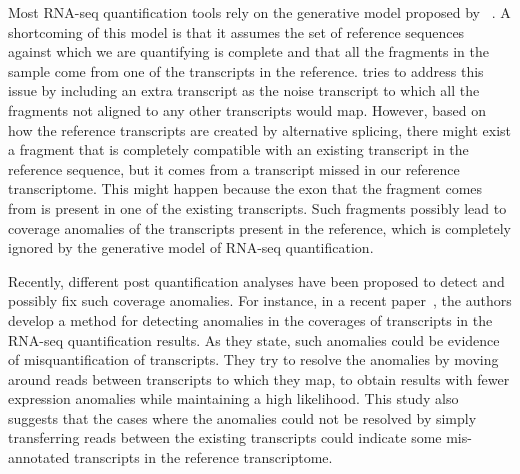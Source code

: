 Most RNA-seq quantification tools rely on the generative model proposed by \rsem~\citep{Li2010RSEM}.
A shortcoming of this model is that
it assumes the set of reference sequences against which we are quantifying is complete and that all 
the fragments in the sample come from one of the transcripts in the reference. \rsem 
tries to address this issue by including an extra transcript as the noise transcript to which all the 
fragments not aligned to any other transcripts would map. However, based on how the reference transcripts
are created by alternative splicing, there might exist a fragment that is completely compatible with
an existing transcript in the reference sequence, but it comes from a transcript missed in our
reference transcriptome. This might happen because the exon that the fragment comes from is present
in one of the existing transcripts. Such fragments possibly lead to coverage anomalies of the transcripts
present in the reference, which is completely ignored by the generative model of RNA-seq quantification.
 
Recently, different post quantification analyses have been proposed to detect and possibly fix such
coverage anomalies. For instance, in a recent paper~\citep{ma2019detecting}, the authors develop a method for
detecting anomalies in the coverages of transcripts in the RNA-seq quantification results. As they state,
such anomalies could be evidence of misquantification of transcripts. They try to resolve the anomalies by
moving around reads between transcripts to which they map, to obtain results with fewer expression anomalies
while maintaining a high likelihood. This study also suggests that the cases where the anomalies could
not be resolved by simply transferring reads between the existing transcripts could indicate some mis-annotated
transcripts in the reference transcriptome.
 
 
